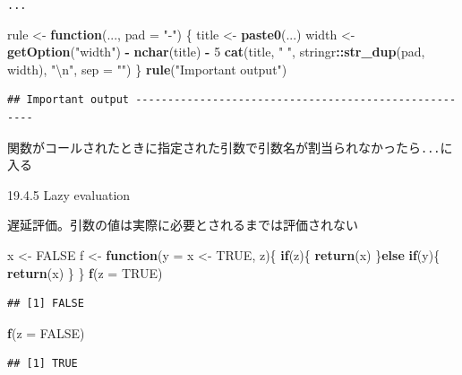 \documentclass[ignorenonframetext,]{beamer}
\newenvironment{Shaded}{\begin{snugshade}}{\end{snugshade}}
\newcommand{\KeywordTok}[1]{\textcolor[rgb]{0.13,0.29,0.53}{\textbf{#1}}}
\newcommand{\DataTypeTok}[1]{\textcolor[rgb]{0.13,0.29,0.53}{#1}}
\newcommand{\DecValTok}[1]{\textcolor[rgb]{0.00,0.00,0.81}{#1}}
\newcommand{\CharTok}[1]{\textcolor[rgb]{0.31,0.60,0.02}{#1}}
\newcommand{\StringTok}[1]{\textcolor[rgb]{0.31,0.60,0.02}{#1}}
\newcommand{\OtherTok}[1]{\textcolor[rgb]{0.56,0.35,0.01}{#1}}
\newcommand{\ControlFlowTok}[1]{\textcolor[rgb]{0.13,0.29,0.53}{\textbf{#1}}}
\newcommand{\OperatorTok}[1]{\textcolor[rgb]{0.81,0.36,0.00}{\textbf{#1}}}
\newcommand{\NormalTok}[1]{#1}
\begin{document}
\begin{frame}[fragile]{\texttt{...}}

\begin{Shaded}
\begin{Highlighting}[]
\NormalTok{rule <-}\StringTok{ }\ControlFlowTok{function}\NormalTok{(..., }\DataTypeTok{pad =} \StringTok{"-"}\NormalTok{) \{}
\NormalTok{  title <-}\StringTok{ }\KeywordTok{paste0}\NormalTok{(...)}
\NormalTok{  width <-}\StringTok{ }\KeywordTok{getOption}\NormalTok{(}\StringTok{"width"}\NormalTok{) }\OperatorTok{-}\StringTok{ }\KeywordTok{nchar}\NormalTok{(title) }\OperatorTok{-}\StringTok{ }\DecValTok{5}
  \KeywordTok{cat}\NormalTok{(title, }\StringTok{" "}\NormalTok{, stringr}\OperatorTok{::}\KeywordTok{str_dup}\NormalTok{(pad, width), }\StringTok{"}\CharTok{\textbackslash{}n}\StringTok{"}\NormalTok{, }\DataTypeTok{sep =} \StringTok{""}\NormalTok{)}
\NormalTok{\}}
\KeywordTok{rule}\NormalTok{(}\StringTok{"Important output"}\NormalTok{) }
\end{Highlighting}
\end{Shaded}

\begin{verbatim}
## Important output ------------------------------------------------------
\end{verbatim}

関数がコールされたときに指定された引数で引数名が割当られなかったら\texttt{...}に入る

\end{frame}

\begin{frame}[fragile]{19.4.5 Lazy evaluation}

遅延評価。引数の値は実際に必要とされるまでは評価されない

\begin{Shaded}
\begin{Highlighting}[]
\NormalTok{x <-}\StringTok{ }\OtherTok{FALSE}
\NormalTok{f <-}\StringTok{ }\ControlFlowTok{function}\NormalTok{(}\DataTypeTok{y =}\NormalTok{ x <-}\StringTok{ }\OtherTok{TRUE}\NormalTok{, z)\{}
  \ControlFlowTok{if}\NormalTok{(z)\{}
    \KeywordTok{return}\NormalTok{(x)}
\NormalTok{  \}}\ControlFlowTok{else} \ControlFlowTok{if}\NormalTok{(y)\{}
    \KeywordTok{return}\NormalTok{(x)}
\NormalTok{  \}}
\NormalTok{\}}
\KeywordTok{f}\NormalTok{(}\DataTypeTok{z =} \OtherTok{TRUE}\NormalTok{)}
\end{Highlighting}
\end{Shaded}

\begin{verbatim}
## [1] FALSE
\end{verbatim}

\begin{Shaded}
\begin{Highlighting}[]
\KeywordTok{f}\NormalTok{(}\DataTypeTok{z =} \OtherTok{FALSE}\NormalTok{)}
\end{Highlighting}
\end{Shaded}

\begin{verbatim}
## [1] TRUE
\end{verbatim}

\end{frame}
\end{document}
